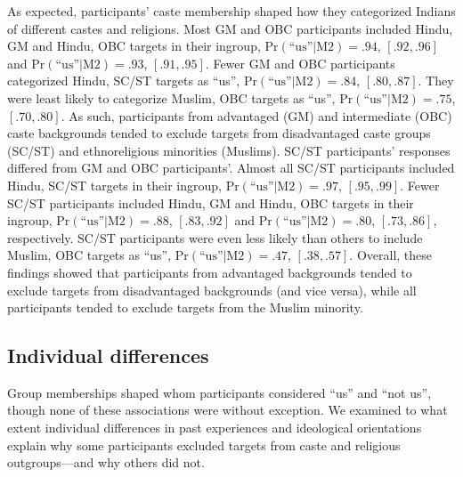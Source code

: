 \documentclass[12pt, a4paper]{article}
\newcommand{\pest}[4]{$ \text{Pr} (\text{``us''} | \text{#1}) = #2$, $[#3, #4]$}
\begin{document}
As expected, participants' caste membership shaped how they categorized Indians of different castes and religions. Most GM and OBC participants included Hindu, GM and Hindu, OBC targets in their ingroup, \pest{M2}{.94}{.92}{.96} and \pest{M2}{.93}{.91}{.95}. Fewer GM and OBC participants categorized Hindu, SC/ST targets as ``us'', \pest{M2}{.84}{.80}{.87}. They were least likely to categorize Muslim, OBC targets as ``us'', \pest{M2}{.75}{.70}{.80}. As such, participants from advantaged (GM) and intermediate (OBC) caste backgrounds tended to exclude targets from disadvantaged caste groups (SC/ST) and ethnoreligious minorities (Muslims). SC/ST participants' responses differed from GM and OBC participants'. Almost all SC/ST participants included Hindu, SC/ST targets in their ingroup, \pest{M2}{.97}{.95}{.99}. Fewer SC/ST participants included Hindu, GM and Hindu, OBC targets in their ingroup, \pest{M2}{.88}{.83}{.92} and \pest{M2}{.80}{.73}{.86}, respectively. SC/ST participants were even less likely than others to include Muslim, OBC targets as ``us'', \pest{M2}{.47}{.38}{.57}. Overall, these findings showed that participants from advantaged backgrounds tended to exclude targets from disadvantaged backgrounds (and vice versa), while all participants tended to exclude targets from the Muslim minority.

\subsection{Individual differences}

Group memberships shaped whom participants considered ``us'' and ``not us'', though none of these associations were without exception. We examined to what extent individual differences in past experiences and ideological orientations explain why some participants excluded targets from caste and religious outgroups---and why others did not.
\end{document}
